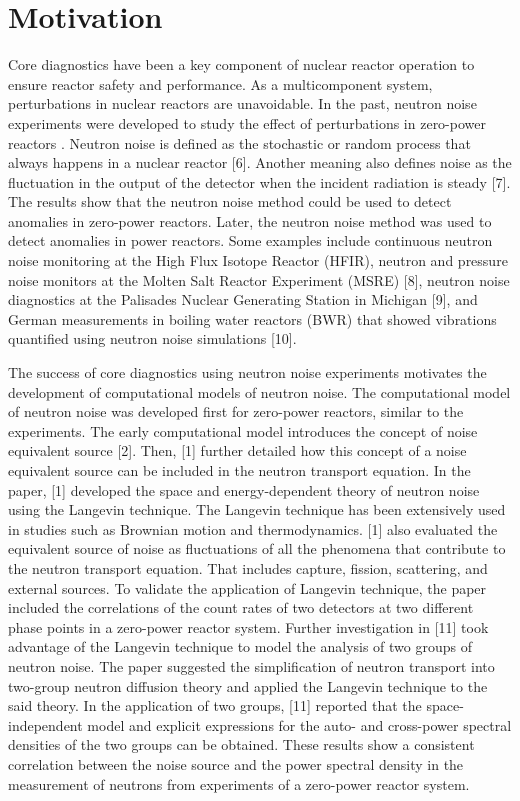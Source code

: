 \label{ch:intro}

\section{Motivation}

Core diagnostics have been a key component of nuclear reactor operation to ensure reactor safety and performance. As a multicomponent system, perturbations in nuclear reactors are unavoidable. In the past, neutron noise experiments were developed to study the effect of perturbations in zero-power reactors \cite{akcasuApplicationLangevinTechnique1966,cohnSimplifiedTheoryPile1960,moorePowerNoiseTransfer1959}. Neutron noise is defined as the stochastic or random process that always happens in a nuclear reactor [6]. Another meaning also defines noise as the fluctuation in the output of the detector when the incident radiation is steady [7]. The results show that the neutron noise method could be used to detect anomalies in zero-power reactors. Later, the neutron noise method was used to detect anomalies in power reactors. Some examples include continuous neutron noise monitoring at the High Flux Isotope Reactor (HFIR), neutron and pressure noise monitors at the Molten Salt Reactor Experiment (MSRE) [8], neutron noise diagnostics at the Palisades Nuclear Generating Station in Michigan [9], and German measurements in boiling water reactors (BWR) that showed vibrations quantified using neutron noise simulations [10]. 

The success of core diagnostics using neutron noise experiments motivates the development of computational models of neutron noise. The computational model of neutron noise was developed first for zero-power reactors, similar to the experiments. The early computational model introduces the concept of noise equivalent source [2]. Then, [1] further detailed how this concept of a noise equivalent source can be included in the neutron transport equation. In the paper, [1] developed the space and energy-dependent theory of neutron noise using the Langevin technique. The Langevin technique has been extensively used in studies such as Brownian motion and thermodynamics. [1] also evaluated the equivalent source of noise as fluctuations of all the phenomena that contribute to the neutron transport equation. That includes capture, fission, scattering, and external sources. To validate the application of Langevin technique, the paper included the correlations of the count rates of two detectors at two different phase points in a zero-power reactor system. Further investigation in [11] took advantage of the Langevin technique to model the analysis of two groups of neutron noise. The paper suggested the simplification of neutron transport into two-group neutron diffusion theory and applied the Langevin technique to the said theory. In the application of two groups, [11] reported that the space-independent model and explicit expressions for the auto- and cross-power spectral densities of the two groups can be obtained. These results show a consistent correlation between the noise source and the power spectral density in the measurement of neutrons from experiments of a zero-power reactor system. 

